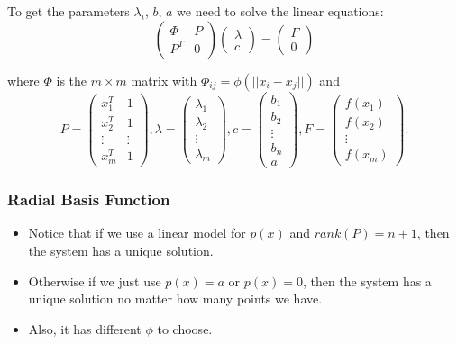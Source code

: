 \documentclass[hyperref={pdfpagelabels=false}]{beamer}
\begin{document}
\begin{frame}
 To get the parameters $\lambda_i$, $b$, $a$ we need to solve the linear equations:
\begin{equation}
\left( \begin{array}{cc} \Phi & P \\
P^T & 0  \end{array} \right)
\left( \begin{array}{c} \lambda \\
c  \end{array} \right)
=
\left( \begin{array}{c} F \\
0  \end{array} \right)
\end{equation}

where $\Phi$ is the $m \times m$ matrix with $\Phi_{ij}=\phi(||x_i-x_j||)$ and
\begin{equation}
P=\left( \begin{array}{cc} x_1^T & 1 \\
x_2^T & 1  \\
\vdots & \vdots \\
x_m^T & 1 \end{array} \right),  
\lambda=\left( \begin{array}{c} \lambda_1 \\
\lambda_2  \\
\vdots  \\
\lambda_m \end{array} \right), 
c=\left( \begin{array}{c} b_1 \\
b_2  \\
\vdots  \\
b_n \\
a \end{array} \right),
F= \left( \begin{array}{c} f(x_1) \\
f(x_2)  \\
\vdots  \\
f(x_m) \end{array} \right).
\end{equation}
\end{frame}


\begin{frame}
\frametitle{Radial Basis Function}
\begin{itemize}
\item Notice that if we use a linear model for $p(x)$ and $rank(P)=n+1$, then the system has a unique solution.
\item Otherwise if we just use $p(x)=a$ or $p(x)=0$, then the system has a unique solution no matter how many points we have.
\item Also, it has different $\phi$ to choose.
\end{itemize}
\end{frame}
\end{document}

